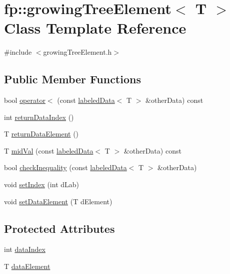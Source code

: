 \hypertarget{classfp_1_1growingTreeElement}{}\section{fp\+:\+:growing\+Tree\+Element$<$ T $>$ Class Template Reference}
\label{classfp_1_1growingTreeElement}


{\ttfamily \#include $<$growing\+Tree\+Element.\+h$>$}

\subsection*{Public Member Functions}
\begin{DoxyCompactItemize}
\item 
bool \hyperlink{classfp_1_1growingTreeElement_ada6dd34623e1db4f83711eaa6ebdb44a}{operator$<$} (const \hyperlink{classfp_1_1labeledData}{labeled\+Data}$<$ T $>$ \&other\+Data) const
\item 
int \hyperlink{classfp_1_1growingTreeElement_a9c18aa94771185dbd8b8bf12dde0070d}{return\+Data\+Index} ()
\item 
T \hyperlink{classfp_1_1growingTreeElement_af928932ccf63dd846c014750d3a7d020}{return\+Data\+Element} ()
\item 
T \hyperlink{classfp_1_1growingTreeElement_a60d0647dff7d4a92d3851209dc15c75f}{mid\+Val} (const \hyperlink{classfp_1_1labeledData}{labeled\+Data}$<$ T $>$ \&other\+Data) const
\item 
bool \hyperlink{classfp_1_1growingTreeElement_a4d94211c8127a82719ac33dd40edf6aa}{check\+Inequality} (const \hyperlink{classfp_1_1labeledData}{labeled\+Data}$<$ T $>$ \&other\+Data)
\item 
void \hyperlink{classfp_1_1growingTreeElement_af343b7265672cf507c5f834c9e005952}{set\+Index} (int d\+Lab)
\item 
void \hyperlink{classfp_1_1growingTreeElement_aa7d20a6d37bef8bbd573a946f664a5c2}{set\+Data\+Element} (T d\+Element)
\end{DoxyCompactItemize}
\subsection*{Protected Attributes}
\begin{DoxyCompactItemize}
\item 
int \hyperlink{classfp_1_1growingTreeElement_a8ba52aff2a9d11fa59a2544fd05c7d45}{data\+Index}
\item 
T \hyperlink{classfp_1_1growingTreeElement_ae56213ef46269673e10a4046d7cfc7e4}{data\+Element}
\end{DoxyCompactItemize}


